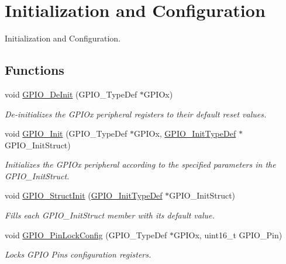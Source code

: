 \hypertarget{group___g_p_i_o___group1}{}\section{Initialization and Configuration}
\label{group___g_p_i_o___group1}


Initialization and Configuration.  


\subsection*{Functions}
\begin{DoxyCompactItemize}
\item 
void \mbox{\hyperlink{group___g_p_i_o___group1_gaa60bdf3182c44b5fa818f237042f52ee}{G\+P\+I\+O\+\_\+\+De\+Init}} (G\+P\+I\+O\+\_\+\+Type\+Def $\ast$G\+P\+I\+Ox)
\begin{DoxyCompactList}\small\item\em De-\/initializes the G\+P\+I\+Ox peripheral registers to their default reset values. \end{DoxyCompactList}\item 
void \mbox{\hyperlink{group___g_p_i_o___group1_ga71abf9404261370d03cca449b88d3a65}{G\+P\+I\+O\+\_\+\+Init}} (G\+P\+I\+O\+\_\+\+Type\+Def $\ast$G\+P\+I\+Ox, \mbox{\hyperlink{struct_g_p_i_o___init_type_def}{G\+P\+I\+O\+\_\+\+Init\+Type\+Def}} $\ast$G\+P\+I\+O\+\_\+\+Init\+Struct)
\begin{DoxyCompactList}\small\item\em Initializes the G\+P\+I\+Ox peripheral according to the specified parameters in the G\+P\+I\+O\+\_\+\+Init\+Struct. \end{DoxyCompactList}\item 
void \mbox{\hyperlink{group___g_p_i_o___group1_gab28de41278e7f8c63d0851e2733b10df}{G\+P\+I\+O\+\_\+\+Struct\+Init}} (\mbox{\hyperlink{struct_g_p_i_o___init_type_def}{G\+P\+I\+O\+\_\+\+Init\+Type\+Def}} $\ast$G\+P\+I\+O\+\_\+\+Init\+Struct)
\begin{DoxyCompactList}\small\item\em Fills each G\+P\+I\+O\+\_\+\+Init\+Struct member with its default value. \end{DoxyCompactList}\item 
void \mbox{\hyperlink{group___g_p_i_o___group1_gad2f2e615928c69fd0d8c641a7cedaafc}{G\+P\+I\+O\+\_\+\+Pin\+Lock\+Config}} (G\+P\+I\+O\+\_\+\+Type\+Def $\ast$G\+P\+I\+Ox, uint16\+\_\+t G\+P\+I\+O\+\_\+\+Pin)
\begin{DoxyCompactList}\small\item\em Locks G\+P\+IO Pins configuration registers. \end{DoxyCompactList}\end{DoxyCompactItemize}


